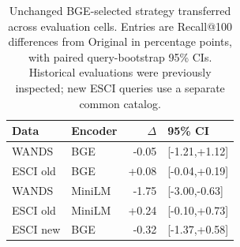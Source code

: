 \begin{table}[t]
\caption{Unchanged BGE-selected strategy transferred across evaluation cells. Entries are Recall@100 differences from Original in percentage points, with paired query-bootstrap 95\% CIs. Historical evaluations were previously inspected; new ESCI queries use a separate common catalog.}
\label{tab:transfer}
\centering\small
\begin{tabular}{llrl}\toprule
Data & Encoder & $\Delta$ & 95\% CI\\\midrule
WANDS & BGE & -0.05 & [-1.21,+1.12]\\
ESCI old & BGE & +0.08 & [-0.04,+0.19]\\
WANDS & MiniLM & -1.75 & [-3.00,-0.63]\\
ESCI old & MiniLM & +0.24 & [-0.10,+0.73]\\
ESCI new & BGE & -0.32 & [-1.37,+0.58]\\
\bottomrule\end{tabular}
\end{table}
